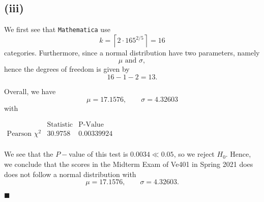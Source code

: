 \documentclass[13pt]{article}
\newcommand{\myqed}{\hfill$\blacksquare$}
\begin{document}
\subsection*{(iii)}
\par We first see that {\tt Mathematica} use 
\begin{equation*}
    k = \left\lceil 2\cdot 165^{2/5}\right\rceil = 16
\end{equation*}
categories. Furthermore, since a normal distribution have two parameters, namely
\begin{equation*}
    \mu\text{ and } \sigma,
\end{equation*}
hence the degrees of freedom is given by 
\begin{equation*}
    16 - 1 - 2 = 13.
\end{equation*}

\par Overall, we have 
\begin{equation*}
    \mu = 17.1576, \qquad \sigma = 4.32603
\end{equation*}
with 
\begin{center}
    $\begin{array}{l|ll}
        \text{} & \text{Statistic} & \text{P-Value} \\
        \hline
        \text{Pearson }\chi ^2 & 30.9758 & 0.00339924 \\
    \end{array}$    
\end{center}

\par We see that the $P-$value of this test is $0.0034\ll 0.05$, so we reject $H_0$. Hence, we conclude that the scores in the Midterm 
Exam of Ve401 in Spring 2021 does does not follow a normal distribution with 
\begin{equation*}
    \mu = 17.1576, \qquad \sigma = 4.32603.
\end{equation*}

\myqed

\newpage
\end{document}
